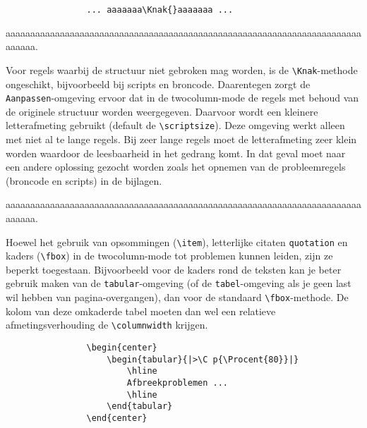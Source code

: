 		\begin{Aanpassen}
			\begin{verbatim}
				... aaaaaaa\Knak{}aaaaaaa ...
			\end{verbatim}
		\end{Aanpassen}
		
		
		aaaaaaaaaaaaaaaaaaaaaaaaaaaaaaaaaaaaaaa\Knak{}aaaaaaaaaaaaaaaaaaaaaaaaaaaaaaaaaaaaaaa.
		
		Voor regels waarbij de structuur niet gebroken mag worden, is de
		\verb!\Knak!-methode ongeschikt, bijvoorbeeld bij scripts en
		broncode. Daarentegen zorgt de \verb!Aanpassen!-omgeving ervoor dat in
		de twocolumn-mode de regels met behoud van de originele structuur
		worden weergegeven. Daarvoor wordt een kleinere letterafmeting
		gebruikt (default de \verb!\scriptsize!). Deze omgeving werkt alleen
		met niet al te lange regels. Bij zeer lange regels moet de
		letterafmeting zeer klein worden waardoor de leesbaarheid in het
		gedrang komt. In dat geval moet naar een andere oplossing gezocht
		worden zoals het opnemen van de probleemregels (broncode en scripts)
		in de bijlagen.
		
		\begin{Aanpassen}[\tiny]
			aaaaaaaaaaaaaaaaaaaaaaaaaaaaaaaaaaaaaaaaaaaaaaaaaaaaaaaaaaaaaaaaaaaaaaaaaaaaaa.
		\end{Aanpassen}
		
		Hoewel het gebruik van opsommingen (\verb!\item!), letterlijke citaten
		\verb!quotation! en kaders (\verb!\fbox!) in de twocolumn-mode tot
		problemen kunnen leiden, zijn ze beperkt toegestaan. Bijvoorbeeld voor
		de kaders rond de teksten kan je beter gebruik maken van de
		\verb!tabular!-omgeving (of de \verb!tabel!-omgeving als je geen last
		wil hebben van pagina-overgangen), dan voor de standaard
		\verb!\fbox!-methode. De kolom van deze omkaderde tabel moeten dan wel
		een relatieve afmetingsverhouding de \verb!\columnwidth! krijgen.
		
		\begin{Aanpassen}
			\begin{verbatim}
				\begin{center}
					\begin{tabular}{|>\C p{\Procent{80}}|}
						\hline
						Afbreekproblemen ...
						\hline
					\end{tabular}
				\end{center}
			\end{verbatim}
		\end{Aanpassen}
		
